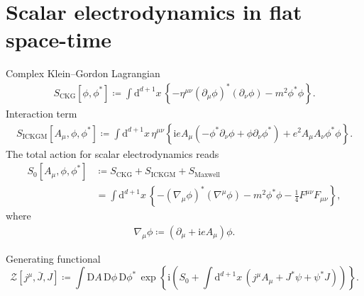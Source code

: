 \documentclass[12pt]{article}
\newcommand\mi{\mathrm{i}} %
\newcommand\dif{\mathrm{d}}
\newcommand\Dif{\mathrm{D}}
\newcommand{\rbr}[1]{{\left(#1\right)}}
\newcommand{\cbr}[1]{{\left\{#1\right\}}}
\newcommand{\sfun}[2]{{#1}\mathopen{}\left[#2\right]\mathclose{}}
\newcommand{\cfun}[2]{{#1}\mathopen{}\left\{#2\right\}\mathclose{}}
\begin{document}
\section{Scalar electrodynamics in flat space-time}

Complex Klein--Gordon Lagrangian
\begin{align}
\sfun{S_\text{CKG}}{\phi,\phi^*}\coloneqq\int\dif^{d+1}x\,\cbr{-\eta^{\mu\nu}
\rbr{\partial_\mu\phi}^* \rbr{\partial_\nu\phi} - m^2\phi^*\phi}.
\end{align}
Interaction term
\begin{align}
\sfun{S_\text{ICKGM}}{A_\mu,\phi,\phi^*} \coloneqq \int\dif^{d+1}x\,
\eta^{\mu\nu}{}
\cbr{\mi e A_\mu \rbr{-\phi^*\partial_\nu\phi+\phi\partial_\nu\phi^*}
+e^2 A_\mu A_\nu \phi^* \phi}.
\end{align}
The total action for scalar electrodynamics reads
\begin{align}
\sfun{S_0}{A_\mu, \phi, \phi^*} &\coloneqq 
S_\text{CKG} + S_\text{ICKGM} + S_\text{Maxwell} \nonumber \\
&= \int\dif^{d+1}x\,\cbr{-\rbr{\nabla_\mu\phi}^* \rbr{\nabla^\mu\phi} - 
m^2\phi^*\phi -\frac{1}{4}F^{\mu\nu}F_{\mu\nu}},
\end{align}
where
\begin{align}
\nabla_\mu\phi \coloneqq \rbr{\partial_\mu+\mi e A_\mu}\phi.
\end{align}

Generating functional
\begin{equation}
\sfun{\mathcal{Z}}{j^\mu, \bar J, J} \coloneqq
\int\Dif A\,\Dif\phi\,\Dif\phi^*\,\cfun{\exp}{\mi\rbr{S_0
+\int\dif^{d+1} x\,\rbr{j^\mu A_\mu + J^* \psi+\psi^* J}}}.
\end{equation}
\end{document}
